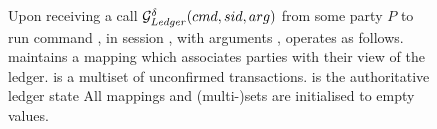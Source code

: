 \begin{figure}[ht]
  \begin{framed}
    \begin{minipage}[t]{\textwidth}
      \textrm{Upon receiving a call $\mathcal{G}_{Ledger}^\delta(cmd,sid,arg)$ from
        some party $P$ to run command \cmd, in session \sid, with arguments
        \arg, \IdealGdledger operates as follows.} \\
      \textrm{\IdealGdledger maintains a mapping \ldgMap which associates
        parties with their view of the ledger.
        \ldgUtxo is a multiset of unconfirmed transactions.
        \ldgState is the authoritative ledger state
        All mappings and (multi-)sets are initialised to empty values.
      }
    \end{minipage}
    \vspace*{0.5em}


\end{framed}
\end{figure}
